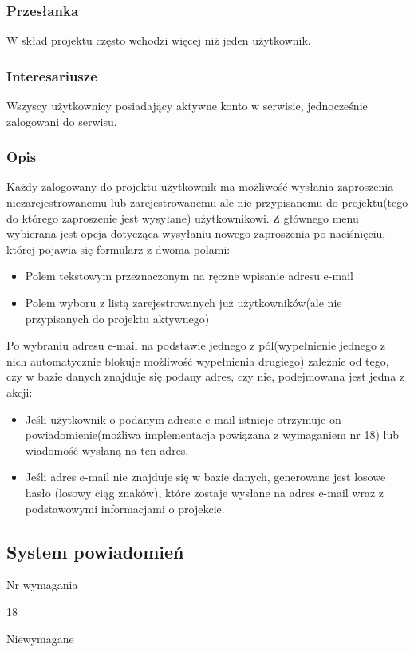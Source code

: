 \documentclass[eng,printmode]{mgr}
\begin{document}
\subsubsection{Przesłanka}
W skład projektu często wchodzi więcej niż jeden użytkownik.

\subsubsection{Interesariusze}
Wszyscy użytkownicy posiadający aktywne konto w serwisie, jednocześnie zalogowani do serwisu.

\subsubsection{Opis}
Każdy zalogowany do projektu użytkownik ma możliwość wysłania zaproszenia niezarejestrowanemu lub zarejestrowanemu ale nie przypisanemu do projektu(tego do którego zaproszenie jest wysyłane) użytkownikowi. Z głównego menu wybierana jest opcja dotycząca wysyłaniu nowego zaproszenia po naciśnięciu, której pojawia się formularz z dwoma polami:
\begin{itemize}
  \item[--] Polem tekstowym przeznaczonym na ręczne wpisanie adresu e-mail
  \item[--] Polem wyboru z listą zarejestrowanych już użytkowników(ale nie przypisanych do projektu aktywnego)
\end{itemize}
Po wybraniu adresu e-mail na podstawie jednego z pól(wypełnienie jednego z nich automatycznie blokuje możliwość wypełnienia drugiego) zależnie od tego, czy w bazie danych znajduje się podany adres, czy nie, podejmowana jest jedna z akcji:
\begin{itemize}
  \item Jeśli użytkownik o podanym adresie e-mail istnieje otrzymuje on powiadomienie(możliwa implementacja powiązana z wymaganiem nr 18) lub wiadomość wysłaną na ten adres.
  \item Jeśli adres e-mail nie znajduje się w bazie danych, generowane jest losowe hasło (losowy ciąg znaków), które zostaje  wysłane na adres e-mail wraz z podstawowymi informacjami o projekcie.
\end{itemize}

\subsection{System powiadomień}
\begin{labeling}{Nr wymagania}
\item [Nr wymagania:] 18
\item [Priorytet:] Niewymagane
\end{labeling}
\end{document}
